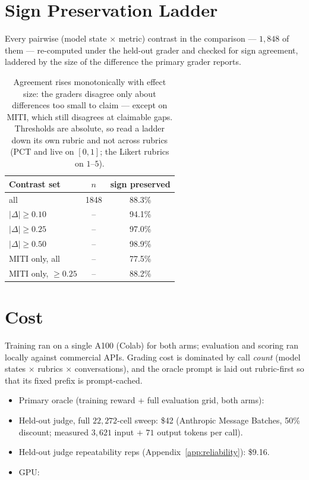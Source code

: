 \section{Sign Preservation Ladder}
\label{app:signs}

Every pairwise (model state $\times$ metric) contrast in the comparison --- $1{,}848$ of
them --- re-computed under the held-out grader and checked for sign agreement, laddered by
the size of the difference the primary grader reports.

\begin{table}[h]
  \centering\small
  \begin{tabular}{@{}lcc@{}}
    \toprule
    Contrast set & $n$ & sign preserved\\
    \midrule
    all                      & 1848 & 88.3\%\\
    $|\Delta| \ge 0.10$      & --   & 94.1\%\\
    $|\Delta| \ge 0.25$      & --   & 97.0\%\\
    $|\Delta| \ge 0.50$      & --   & 98.9\%\\
    \midrule
    MITI only, all           & --   & 77.5\%\\
    MITI only, $\ge 0.25$    & --   & 88.2\%\\
    \bottomrule
  \end{tabular}
  \caption{Agreement rises monotonically with effect size: the graders disagree only about
  differences too small to claim --- except on MITI, which still disagrees at claimable
  gaps.  Thresholds are
  absolute, so read a ladder down its own rubric and not across rubrics (PCT and \mici{}
  live on $[0,1]$; the Likert rubrics on $1$--$5$).}
  \label{tab:signladder}
\end{table}

\section{Cost}
\label{app:cost}

Training ran on a single A100 (Colab) for both arms; evaluation and scoring ran locally
against commercial APIs. Grading cost is dominated by call \emph{count}
(model states $\times$ rubrics $\times$ conversations), and the oracle prompt is laid out
rubric-first so that its fixed prefix is prompt-cached.

\begin{itemize}\itemsep1pt
  \item Primary oracle (training reward + full evaluation grid, both arms):
  \item Held-out judge, full $22{,}272$-cell sweep: \$42 (Anthropic Message Batches, 50\%
        discount; measured $3{,}621$ input $+$ $71$ output tokens per call).
  \item Held-out judge repeatability reps (Appendix~\ref{app:reliability}): \$9.16.
  \item GPU: 
\end{itemize}

